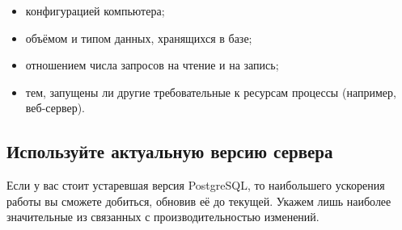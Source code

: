 \begin{itemize}
  \item конфигурацией компьютера;
  \item объёмом и типом данных, хранящихся в базе;
  \item отношением числа запросов на чтение и на запись;
  \item тем, запущены ли другие требовательные к ресурсам процессы (например, веб-сервер).
\end{itemize}


\subsection{Используйте актуальную версию сервера}
Если у вас стоит устаревшая версия PostgreSQL, то наибольшего ускорения работы вы сможете добиться, обновив её до текущей. Укажем лишь наиболее значительные из связанных с производительностью изменений.

